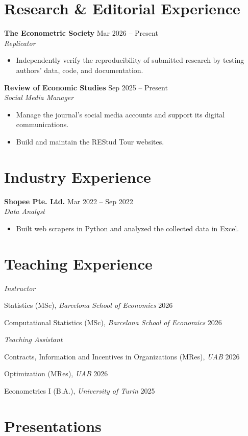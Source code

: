 \documentclass[11pt,a4paper]{article}
\newcommand{\entry}[4]{%
    \textbf{#1} \hfill #2\\
    \textit{#3}\par
    #4
    \vspace{0.6em}
}
\newcommand{\course}[3]{%
    #1, \textit{#2} \hfill #3\par
}
\begin{document}
\section*{Research \& Editorial Experience}

\entry{The Econometric Society}{Mar 2026 -- Present}{Replicator}{
\begin{itemize}
    \item Independently verify the reproducibility of submitted research by testing authors' data, code, and documentation.
\end{itemize}
}

\entry{Review of Economic Studies}{Sep 2025 -- Present}{Social Media Manager}{
\begin{itemize}
    \item Manage the journal's social media accounts and support its digital communications.
    \item Build and maintain the REStud Tour websites.
\end{itemize}
}

\section*{Industry Experience}

\entry{Shopee Pte. Ltd.}{Mar 2022 -- Sep 2022}{Data Analyst}{
\begin{itemize}
    \item Built web scrapers in Python and analyzed the collected data in Excel.
\end{itemize}
}

\section*{Teaching Experience}

\textit{Instructor}\par
\course{Statistics (MSc)}{Barcelona School of Economics}{2026}
\course{Computational Statistics (MSc)}{Barcelona School of Economics}{2026}

\vspace{0.5em}
\textit{Teaching Assistant}\par
\course{Contracts, Information and Incentives in Organizations (MRes)}{UAB}{2026}
\course{Optimization (MRes)}{UAB}{2026}
\course{Econometrics I (B.A.)}{University of Turin}{2025}

\section*{Presentations}
\end{document}
